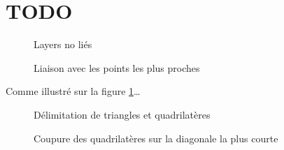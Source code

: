 \documentclass[article, backcover, french, nodocumentinfo]{upmethodology-document}
\newcommand{\TODO}[2][ ]{\todo[inline,color=green]{#2}}
\begin{document}
	\thispagestyle{empty}
	\upmdocumentsummary{}
	\upmdocumentauthors{}
	\upmdocumentinformedpeople{}
	\upmpublicationpage{}
	\newpage{}
	\tableofcontents{}
	\newpage{}
	\section{TODO}
		\TODO{TODO}
		\par\noindent\begin{minipage}[t]{\textwidth}
			\centering
			\begin{minipage}[t]{0.49\textwidth}
				\begin{figure}[H]
					\centering%
					\caption{Layers no liés}%
					\label{fig:layers_1_empty}%
				\end{figure}
			\end{minipage}
			\begin{minipage}[t]{0.49\textwidth}
				\begin{figure}[H]
					\centering%
					\caption{Liaison avec les points les plus proches}%
					\label{fig:layers_2_nearest_lines}%
				\end{figure}
			\end{minipage}
		\end{minipage}
		\TODO{TODO}
		Comme illustré sur la figure \ref{fig:layers_1_empty}\ldots
		\par\noindent\begin{minipage}[t]{\textwidth}
			\centering
			\begin{minipage}[t]{0.49\textwidth}
				\begin{figure}[H]
					\centering%
					\caption{Délimitation de triangles et quadrilatères}%
					\label{fig:layers_3_triangles_quadrilaterals}%
				\end{figure}
			\end{minipage}
			\begin{minipage}[t]{0.49\textwidth}
				\begin{figure}[H]
					\centering%
					\caption{Coupure des quadrilatères sur la diagonale la plus courte}%
					\label{fig:layers_4_quadrilaterals_diagonals}%
				\end{figure}
			\end{minipage}
		\end{minipage}
\end{document}
